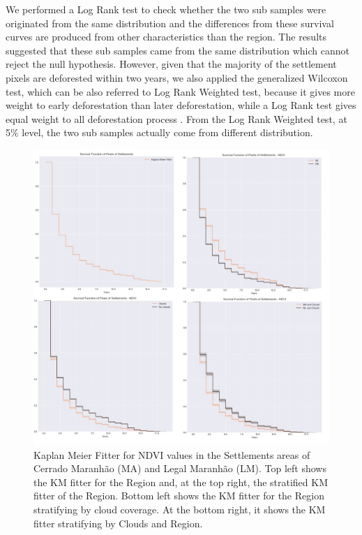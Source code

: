 We performed a Log Rank test \citep{Peto_1972} to check whether the two sub samples were originated from the same distribution and the differences from these survival curves are produced from other characteristics than the region. The results suggested that these sub samples came from the same distribution which cannot reject the null hypothesis. However, given that the majority of the settlement pixels are deforested within two years, we also applied the generalized Wilcoxon test, which can be also referred to Log Rank Weighted test, because it gives more weight to early deforestation than later deforestation, while a Log Rank test gives equal weight to all deforestation process \citep{lee_wang_2003}. From the Log Rank Weighted test, at 5\% level, the two sub samples actually come from different distribution.


\begin{figure}[H]
  \centering
  \includegraphics[width=1\textwidth]{KM_NDVI_sett_total.jpg}
\caption[Kaplan Meier Fitter for NDVI values in Settlements]{Kaplan Meier Fitter for NDVI values in the Settlements areas of Cerrado Maranhão  (MA) and Legal Maranhão  (LM). Top left shows the KM fitter for the Region and, at the top right, the stratified KM fitter of the Region. Bottom left shows the KM fitter for the Region stratifying by cloud coverage. At the bottom right, it shows the KM fitter stratifying by Clouds and Region.}
\label{fig:km-total-sett}
\end{figure}

